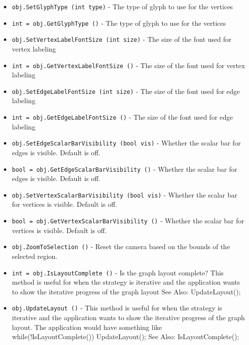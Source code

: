 \begin{itemize}
\item  \verb|obj.SetGlyphType (int type)| -  The type of glyph to use for the vertices

\item  \verb|int = obj.GetGlyphType ()| -  The type of glyph to use for the vertices

\item  \verb|obj.SetVertexLabelFontSize (int size)| -  The size of the font used for vertex labeling

\item  \verb|int = obj.GetVertexLabelFontSize ()| -  The size of the font used for vertex labeling

\item  \verb|obj.SetEdgeLabelFontSize (int size)| -  The size of the font used for edge labeling

\item  \verb|int = obj.GetEdgeLabelFontSize ()| -  The size of the font used for edge labeling

\item  \verb|obj.SetEdgeScalarBarVisibility (bool vis)| -  Whether the scalar bar for edges is visible.  Default is off.

\item  \verb|bool = obj.GetEdgeScalarBarVisibility ()| -  Whether the scalar bar for edges is visible.  Default is off.

\item  \verb|obj.SetVertexScalarBarVisibility (bool vis)| -  Whether the scalar bar for vertices is visible.  Default is off.

\item  \verb|bool = obj.GetVertexScalarBarVisibility ()| -  Whether the scalar bar for vertices is visible.  Default is off.

\item  \verb|obj.ZoomToSelection ()| -  Reset the camera based on the bounds of the selected region.

\item  \verb|int = obj.IsLayoutComplete ()| -  Is the graph layout complete? This method is useful
 for when the strategy is iterative and the application
 wants to show the iterative progress of the graph layout
 See Also: UpdateLayout();

\item  \verb|obj.UpdateLayout ()| -  This method is useful for when the strategy is iterative 
 and the application wants to show the iterative progress 
 of the graph layout. The application would have something like
 while(!IsLayoutComplete())
   {
   UpdateLayout();
   }
 See Also: IsLayoutComplete();

\end{itemize}
